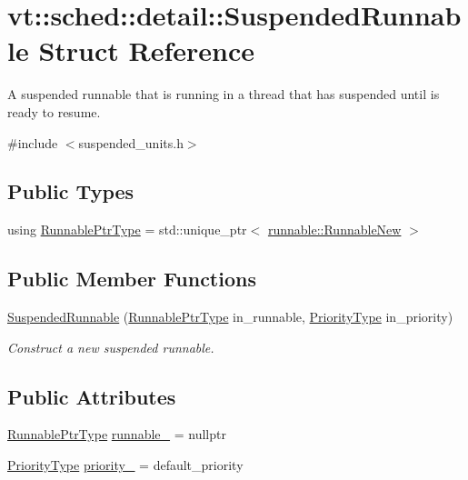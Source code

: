 \hypertarget{structvt_1_1sched_1_1detail_1_1_suspended_runnable}{}\section{vt\+:\+:sched\+:\+:detail\+:\+:Suspended\+Runnable Struct Reference}
\label{structvt_1_1sched_1_1detail_1_1_suspended_runnable}


A suspended runnable that is running in a thread that has suspended until is ready to resume.  




{\ttfamily \#include $<$suspended\+\_\+units.\+h$>$}

\subsection*{Public Types}
\begin{DoxyCompactItemize}
\item 
using \hyperlink{structvt_1_1sched_1_1detail_1_1_suspended_runnable_a36c09816947c24b12e308afd53d26d1c}{Runnable\+Ptr\+Type} = std\+::unique\+\_\+ptr$<$ \hyperlink{structvt_1_1runnable_1_1_runnable_new}{runnable\+::\+Runnable\+New} $>$
\end{DoxyCompactItemize}
\subsection*{Public Member Functions}
\begin{DoxyCompactItemize}
\item 
\hyperlink{structvt_1_1sched_1_1detail_1_1_suspended_runnable_a2bc6c62d0934ab1f58f1367d62c0e4ef}{Suspended\+Runnable} (\hyperlink{structvt_1_1sched_1_1detail_1_1_suspended_runnable_a36c09816947c24b12e308afd53d26d1c}{Runnable\+Ptr\+Type} in\+\_\+runnable, \hyperlink{namespacevt_a86bff9f556eb761b27fc8600d006ac04}{Priority\+Type} in\+\_\+priority)
\begin{DoxyCompactList}\small\item\em Construct a new suspended runnable. \end{DoxyCompactList}\end{DoxyCompactItemize}
\subsection*{Public Attributes}
\begin{DoxyCompactItemize}
\item 
\hyperlink{structvt_1_1sched_1_1detail_1_1_suspended_runnable_a36c09816947c24b12e308afd53d26d1c}{Runnable\+Ptr\+Type} \hyperlink{structvt_1_1sched_1_1detail_1_1_suspended_runnable_a75e2acf06f06e65bee0f88a14accc1c8}{runnable\+\_\+} = nullptr
\item 
\hyperlink{namespacevt_a86bff9f556eb761b27fc8600d006ac04}{Priority\+Type} \hyperlink{structvt_1_1sched_1_1detail_1_1_suspended_runnable_ab591ea2e254d1f520c775a082f361c68}{priority\+\_\+} = default\+\_\+priority
\end{DoxyCompactItemize}


